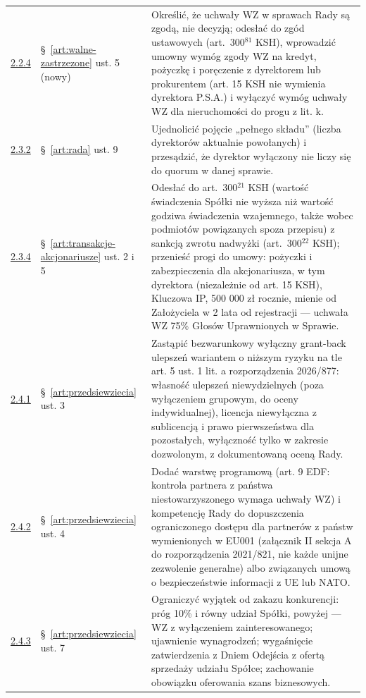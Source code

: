 \documentclass[12pt,a4paper]{report}
\begin{document}
\begin{longtable}{@{}p{1.3cm} p{3.3cm} p{9.6cm}@{}}
\hyperref[memo:2.2.4]{2.2.4} & §~\ref{art:walne-zastrzezone} ust. 5 (nowy) & Określić, że uchwały WZ w sprawach Rady są zgodą, nie decyzją; odesłać do zgód ustawowych (art.~300$^{81}$ KSH), wprowadzić umowny wymóg zgody WZ na kredyt, pożyczkę i poręczenie z dyrektorem lub prokurentem (art. 15 KSH nie wymienia dyrektora P.S.A.) i wyłączyć wymóg uchwały WZ dla nieruchomości do progu z lit. k. \\
\hyperref[memo:2.3.2]{2.3.2} & §~\ref{art:rada} ust. 9 & Ujednolicić pojęcie „pełnego składu” (liczba dyrektorów aktualnie powołanych) i przesądzić, że dyrektor wyłączony nie liczy się do quorum w danej sprawie. \\
\hyperref[memo:2.3.4]{2.3.4} & §~\ref{art:transakcje-akcjonariusze} ust. 2 i 5 & Odesłać do art.~300$^{21}$ KSH (wartość świadczenia Spółki nie wyższa niż wartość godziwa świadczenia wzajemnego, także wobec podmiotów powiązanych spoza przepisu) z sankcją zwrotu nadwyżki (art.~300$^{22}$ KSH); przenieść progi do umowy: pożyczki i zabezpieczenia dla akcjonariusza, w tym dyrektora (niezależnie od art. 15 KSH), Kluczowa IP, 500 000 zł rocznie, mienie od Założyciela w 2 lata od rejestracji — uchwała WZ 75\% Głosów Uprawnionych w Sprawie. \\
\hyperref[memo:2.4.1]{2.4.1} & §~\ref{art:przedsiewziecia} ust. 3 & Zastąpić bezwarunkowy wyłączny grant-back ulepszeń wariantem o niższym ryzyku na tle art. 5 ust. 1 lit. a rozporządzenia 2026/877: własność ulepszeń niewydzielnych (poza wyłączeniem grupowym, do oceny indywidualnej), licencja niewyłączna z sublicencją i prawo pierwszeństwa dla pozostałych, wyłączność tylko w zakresie dozwolonym, z dokumentowaną oceną Rady. \\
\hyperref[memo:2.4.2]{2.4.2} & §~\ref{art:przedsiewziecia} ust. 4 & Dodać warstwę programową (art. 9 EDF: kontrola partnera z państwa niestowarzyszonego wymaga uchwały WZ) i kompetencję Rady do dopuszczenia ograniczonego dostępu dla partnerów z państw wymienionych w EU001 (załącznik II sekcja A do rozporządzenia 2021/821, nie każde unijne zezwolenie generalne) albo związanych umową o bezpieczeństwie informacji z UE lub NATO. \\
\hyperref[memo:2.4.3]{2.4.3} & §~\ref{art:przedsiewziecia} ust. 7 & Ograniczyć wyjątek od zakazu konkurencji: próg 10\% i równy udział Spółki, powyżej — WZ z wyłączeniem zainteresowanego; ujawnienie wynagrodzeń; wygaśnięcie zatwierdzenia z Dniem Odejścia z ofertą sprzedaży udziału Spółce; zachowanie obowiązku oferowania szans biznesowych. \\

\end{longtable}
\end{document}
